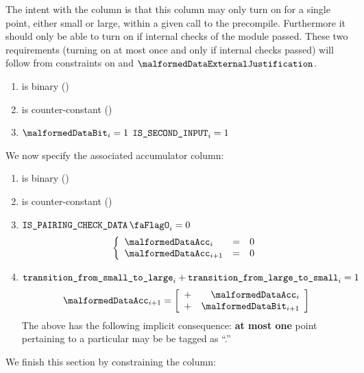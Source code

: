 The intent with the \malformedDataBit{} column is that this column may only turn on for a single point, either small or large, within a given call to the  precompile. Furthermore it should only be able to turn on if internal checks of the module passed.
These two requirements (turning on at most once and only if internal checks passed) will follow from constraints on \malformedDataAcc{} and $\malformedDataExternalJustification$.

\begin{enumerate}
    \item \malformedDataBit{} is binary \quad (\trash)
    \item \malformedDataBit{} is counter-constant \quad (\trash)
    \item \If $\malformedDataBit_{i} = 1$ \Then $\texttt{IS\_SECOND\_INPUT}_{i} = 1$
\end{enumerate}
We now specify the associated accumulator column:
\begin{enumerate}[resume]
    \item \malformedDataAcc{} is binary \quad (\trash)
    \item \malformedDataAcc{} is counter-constant \quad (\trash)
    \item \If $\isBlsPairingCheckData_{i} = 0$ \Then
          \[
              \left\{ \begin{array}{lcl}
                  \malformedDataAcc _{i}     & = & 0 \\
                  \malformedDataAcc _{i + 1} & = & 0 \\
              \end{array} \right.
          \]
    \item \If $\texttt{transition\_from\_small\_to\_large}_{i} + \texttt{transition\_from\_large\_to\_small}_{i} = 1$ \Then
          \[
              \malformedDataAcc _{i + 1} =
              \left[ \begin{array}{cr}
                      + & \malformedDataAcc _{i}     \\
                      + & \malformedDataBit    _{i + 1} \\
                  \end{array} \right]
          \]
          \saNote{} The above has the following implicit consequence: \textbf{at most one} point pertaining to a particular \blsId{} may be be tagged as ``\malformedDataBit.''
\end{enumerate}
We finish this section by constraining the \malformedDataExternalJustification{} column:

